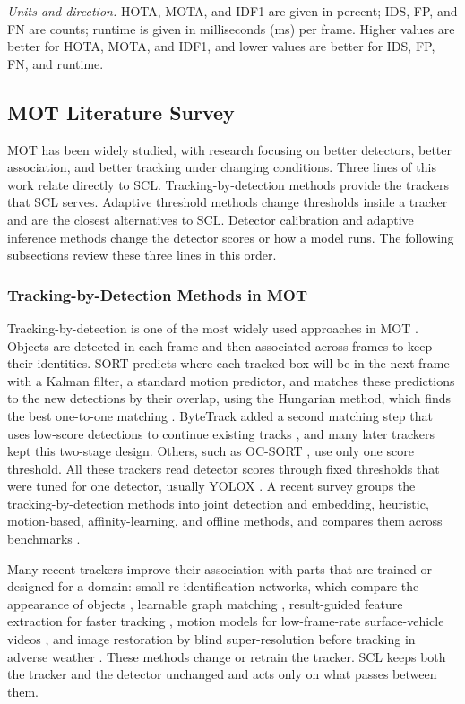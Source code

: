 \documentclass[pdflatex,sn-mathphys-num,iicol]{sn-jnl}
\newcommand{\scl}{SCL}
\begin{document}
\emph{Units and direction.} HOTA, MOTA, and IDF1 are given in percent; IDS, FP, and FN are counts;
runtime is given in milliseconds (ms) per frame. Higher values are better for HOTA, MOTA, and IDF1,
and lower values are better for IDS, FP, FN, and runtime.

\subsection{MOT Literature Survey}\label{sec:survey}
MOT has been widely studied, with research focusing on better detectors, better association, and
better tracking under changing conditions. Three lines of this work relate directly to \scl{}.
Tracking-by-detection methods provide the trackers that \scl{} serves. Adaptive threshold methods
change thresholds inside a tracker and are the closest alternatives to \scl{}. Detector calibration
and adaptive inference methods change the detector scores or how a model runs. The following
subsections review these three lines in this order.

\subsubsection{Tracking-by-Detection Methods in MOT}\label{sec:hosts}
Tracking-by-detection is one of the most widely used approaches in MOT \cite{adzemovic2026survey}.
Objects are detected in each frame and then associated across frames to keep their identities.
SORT predicts where each tracked box will be in the next frame with a Kalman filter, a standard
motion predictor, and matches these predictions to the new detections by their overlap, using the
Hungarian method, which finds the best one-to-one matching \cite{bewley2016sort}. ByteTrack added a
second matching step that uses low-score detections to continue existing tracks
\cite{zhang2022bytetrack}, and many later trackers kept this two-stage design. Others, such as
OC-SORT \cite{cao2023ocsort}, use only one score threshold. All these trackers read detector scores
through fixed thresholds that were tuned for one detector, usually YOLOX \cite{ge2021yolox}. A recent
survey groups the tracking-by-detection methods into joint detection and embedding, heuristic,
motion-based, affinity-learning, and offline methods, and compares them across benchmarks
\cite{adzemovic2026survey}.

Many recent trackers improve their association with parts that are trained or designed for a
domain: small re-identification networks, which compare the appearance of objects
\cite{li2024fdbtrack}, learnable graph matching \cite{bao2024graphmatching,zhang2025sinkhorn},
result-guided feature extraction for faster tracking \cite{ding2025remot}, motion models for
low-frame-rate surface-vehicle videos \cite{liang2024motiontrack}, and image restoration by blind
super-resolution before tracking in adverse weather \cite{sun2026bsr}. These methods change or
retrain the tracker. \scl{} keeps both the tracker and the detector unchanged and acts only on what
passes between them.
\end{document}
